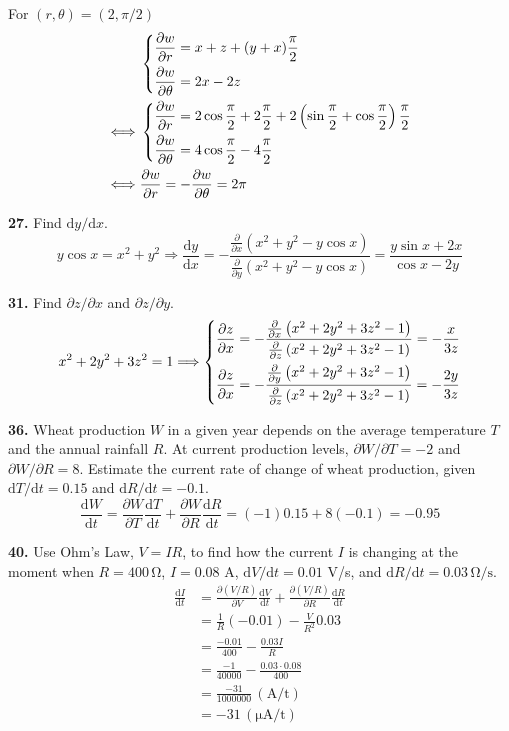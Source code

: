 \documentclass[a4paper,12pt]{article}
\newcommand{\tho}[3][]{\frac{\partial #1 #2}{\partial #3 #1}}
\newcommand{\leibniz}[3][]{\frac{\mathrm{d} #1 #2}{\mathrm{d} #3 #1}}
\newcommand{\exercise}[1]{\noindent\textbf{#1.}}
\begin{document}
For $(r, \theta) = (2, \pi/2)$
\begin{align*}
& \begin{dcases}
    \tho{w}{r} = x + z + (y + x)\frac{\pi}{2}\\
    \tho{w}{\theta} = 2x - 2z
  \end{dcases}\\
\iff
& \begin{dcases}
    \tho{w}{r} = 2\cos\frac{\pi}{2} + 2\frac{\pi}{2} + 2\left(\sin\frac{\pi}{2}
                 + \cos\frac{\pi}{2}\right)\frac{\pi}{2}\\
    \tho{w}{\theta} = 4\cos\frac{\pi}{2} - 4\frac{\pi}{2}
  \end{dcases}\\
\iff& \tho{w}{r} = -\tho{w}{\theta} = 2\pi
\end{align*}

\exercise{27} Find $\mathrm{d}y/\mathrm{d}x$.
\[y\cos x = x^2 + y^2
  \Longrightarrow
  \leibniz{y}{x}
= -\frac{\tho{}{x}\left(x^2 + y^2 - y\cos x\right)}
        {\tho{}{y}\left(x^2 + y^2 - y\cos x\right)}
= \frac{y\sin x + 2x}{\cos x - 2y}\]

\exercise{31} Find $\partial z/\partial x$ and $\partial z/\partial y$.
\[x^2 + 2y^2 + 3z^2 = 1
\Longrightarrow
\begin{dcases}
  \tho{z}{x} = -\frac{\tho{}{x}\left(x^2 + 2y^2 + 3z^2 - 1\right)}
                     {\tho{}{z}\left(x^2 + 2y^2 + 3z^2 - 1\right)}
             = -\frac{x}{3z}\\
  \tho{z}{x} = -\frac{\tho{}{y}\left(x^2 + 2y^2 + 3z^2 - 1\right)}
                     {\tho{}{z}\left(x^2 + 2y^2 + 3z^2 - 1\right)}
             = -\frac{2y}{3z}
\end{dcases}\]

\exercise{36} Wheat production $W$ in a given year depends on the average
temperature $T$ and the annual rainfall $R$. At current production levels,
$\partial W/\partial T = -2$ and $\partial W/\partial R = 8$. Estimate the
current rate of change of wheat production, given $\mathrm{d}T/\mathrm{d}t=0.15$
and $\mathrm{d}R/\mathrm{d}t=-0.1$.
\[\leibniz{W}{t}
= \tho{W}{T}\leibniz{T}{t} + \tho{W}{R}\leibniz{R}{t}
= (-1)0.15 + 8(-0.1)
= -0.95\]

\exercise{40} Use Ohm’s Law, $V = IR$, to find how the current $I$
is changing at the moment when $R = 400\,\mathrm\Omega$, $I = 0.08$ A,
$\mathrm{d}V/\mathrm{d}t = 0.01$ V/s,
and $\mathrm{d}R/\mathrm{d}t = 0.03\,\mathrm{\Omega/s}$.
\begin{align*}
   \leibniz{I}{t}
&= \tho{(V/R)}{V}\leibniz{V}{t} + \tho{(V/R)}{R}\leibniz{R}{t}\\
&= \frac{1}{R}(-0.01) - \frac{V}{R^2}0.03\\
&= \frac{-0.01}{400} - \frac{0.03I}{R}\\
&= \frac{-1}{40000} - \frac{0.03 \cdot 0.08}{400}\\
&= \frac{-31}{1000000}\,\mathrm{(A/t)}\\
&= -31\,\mathrm{(\mu A/t)}
\end{align*}
\end{document}

